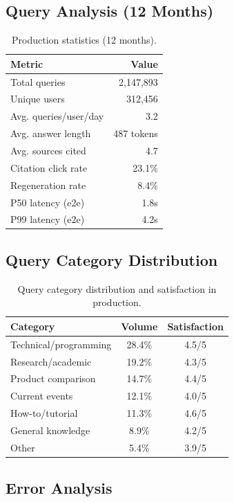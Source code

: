 \documentclass[11pt,twocolumn]{article}
\begin{document}
\subsection{Query Analysis (12 Months)}

\begin{table}[H]
\centering
\begin{tabular}{lr}
\toprule
\textbf{Metric} & \textbf{Value} \\
\midrule
Total queries & 2,147,893 \\
Unique users & 312,456 \\
Avg. queries/user/day & 3.2 \\
Avg. answer length & 487 tokens \\
Avg. sources cited & 4.7 \\
Citation click rate & 23.1\% \\
Regeneration rate & 8.4\% \\
P50 latency (e2e) & 1.8s \\
P99 latency (e2e) & 4.2s \\
\bottomrule
\end{tabular}
\caption{Production statistics (12 months).}
\label{tab:prod_stats}
\end{table}

\subsection{Query Category Distribution}

\begin{table}[H]
\centering
\small
\begin{tabular}{lcc}
\toprule
\textbf{Category} & \textbf{Volume} & \textbf{Satisfaction} \\
\midrule
Technical/programming & 28.4\% & 4.5/5 \\
Research/academic & 19.2\% & 4.3/5 \\
Product comparison & 14.7\% & 4.4/5 \\
Current events & 12.1\% & 4.0/5 \\
How-to/tutorial & 11.3\% & 4.6/5 \\
General knowledge & 8.9\% & 4.2/5 \\
Other & 5.4\% & 3.9/5 \\
\bottomrule
\end{tabular}
\caption{Query category distribution and satisfaction in production.}
\label{tab:query_dist}
\end{table}

\subsection{Error Analysis}
\end{document}
